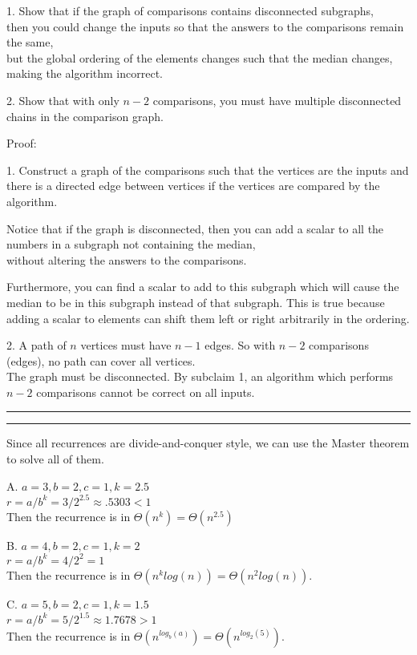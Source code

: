 \documentclass[11pt,letterpaper]{article}
\newcommand{\question}[1] {\vspace{.25in} \hrule\vspace{0.5em}
\noindent{\bf #1} \vspace{0.5em}
\hrule \vspace{.10in}}
\begin{document}
1. Show that if the graph of comparisons contains disconnected subgraphs,\\
then you could change the inputs so that the answers to the comparisons remain the same,\\
but the global ordering of the elements changes such that the median changes, making the algorithm incorrect.

2. Show that with only $n-2$ comparisons, you must have multiple disconnected chains in the comparison graph.

Proof:

1. Construct a graph of the comparisons such that the vertices are the inputs and there is a directed edge
between vertices if the vertices are compared by the algorithm.

Notice that if the graph is disconnected, then you can add a scalar to all the numbers in a subgraph not containing the median, \\
without altering the answers to the comparisons.

Furthermore, you can find a scalar to add to this subgraph which will cause the median to be in this subgraph instead of that subgraph.
This is true because adding a scalar to elements can shift them left or right arbitrarily in the ordering.

2. A path of $n$ vertices must have $n-1$ edges. So with $n-2$ comparisons (edges), no path can cover all vertices.\\
The graph must be disconnected. By subclaim 1, an algorithm which performs $n-2$ comparisons cannot be correct on all inputs.

\question{1d.}
Since all recurrences are divide-and-conquer style, we can use the Master theorem to solve all of them.

A. $a=3, b=2, c=1, k=2.5$\\
$r = a/b^{k} = 3/2^{2.5} \approx .5303 < 1$\\
Then the recurrence is in $\Theta(n^k) = \Theta(n^{2.5})$

B. $a=4, b=2, c=1, k=2$\\
$r = a/b^{k} = 4/2^{2} = 1$\\
Then the recurrence is in $\Theta(n^k log(n)) = \Theta(n^{2} log(n))$.

C. $a=5, b=2, c=1, k=1.5$\\
$r = a/b^{k} = 5/2^{1.5} \approx 1.7678 > 1$\\
Then the recurrence is in $\Theta(n^{log_b(a)}) = \Theta(n^{log_2(5)})$.
\end{document}
